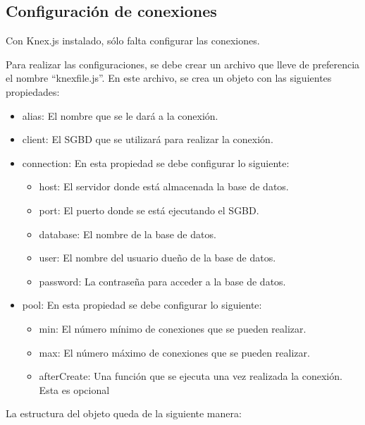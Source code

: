 \subsection{Configuración de conexiones}
Con Knex.js instalado, sólo falta configurar las conexiones.

Para realizar las configuraciones, se debe crear un archivo que lleve de preferencia el nombre ``knexfile.js''. En este archivo, se crea un objeto con las siguientes propiedades:
    \begin{itemize}
        \item alias: El nombre que se le dará a la conexión.
        \item client: El SGBD que se utilizará para realizar la conexión.
        \item connection: En esta propiedad se debe configurar lo siguiente:
            \begin{itemize}
                \item host: El servidor donde está almacenada la base de datos.
                \item port: El puerto donde se está ejecutando el SGBD.
                \item database: El nombre de la base de datos.
                \item user: El nombre del usuario dueño de la base de datos.
                \item password: La contraseña para acceder a la base de datos.
            \end{itemize}
        \item pool: En esta propiedad se debe configurar lo siguiente:
            \begin{itemize}
                \item min: El número mínimo de conexiones que se pueden realizar.
                \item max: El número máximo de conexiones que se pueden realizar.
                \item afterCreate: Una función que se ejecuta una vez realizada la conexión. Esta es opcional
            \end{itemize}
    \end{itemize}
La estructura del objeto queda de la siguiente manera:
